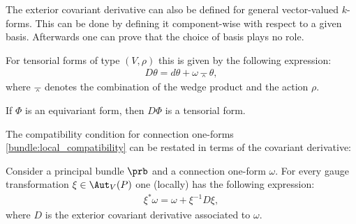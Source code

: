     \begin{remark}
        The exterior covariant derivative can also be defined for general vector-valued $k$-forms. This can be done by defining it component-wise with respect to a given basis. Afterwards one can prove that the choice of basis plays no role.

        For tensorial forms of type $(V,\rho)$ this is given by the following expression:
        \begin{gather}
            \label{bundle:derivative_horizontal_form}
            D\theta = d\theta + \omega\barwedge\theta,
        \end{gather}
        where $\barwedge$ denotes the combination of the wedge product and the action $\rho$.
    \end{remark}
    \begin{property}[Tensorial]\label{bundle:tensorial_derivative}
        If $\Phi$ is an equivariant form, then $D\Phi$ is a tensorial form.
    \end{property}

    The compatibility condition for connection one-forms \eqref{bundle:local_compatibility} can be restated in terms of the covariant derivative:
    \begin{property}
        Consider a principal bundle $\prb$ and a connection one-form $\omega$. For every gauge transformation $\xi\in\Aut_V(P)$ one (locally) has the following expression:
        \begin{gather}
            \label{bundle:connection_gauge_transformation}
            \xi^*\omega = \omega + \xi^{-1}D\xi,
        \end{gather}
        where $D$ is the exterior covariant derivative associated to $\omega$.
    \end{property}

